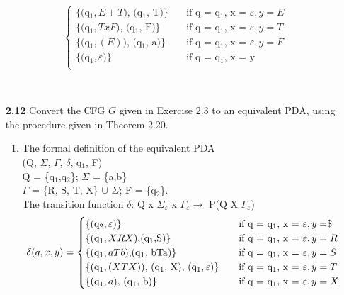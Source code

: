 \documentclass[12pt]{letter}
\begin{document}
\begin{enumerate}
\[\begin{cases}
	\text{\{(q$_{1}, E+T$), (q$_{1}$, T)\}} 
	&\quad\text{if q = q$_{1}$, x = $\varepsilon$}, y = E \\
	
	\text{\{(q$_{1}, TxF$), (q$_{1}$, F)\}} 
	&\quad\text{if q = q$_{1}$, x = $\varepsilon$}, y = T \\
	
	\text{\{(q$_{1}, (E)$), (q$_{1}$, a)\}} 
	&\quad\text{if q = q$_{1}$, x = $\varepsilon$}, y = F \\
	
	\text{\{(q$_{1}, \varepsilon$)\}} 
	&\quad\text{if q = q$_{1}$, x = y}\\ 
	\end{cases}
	\]	

\ \\ %
\item[\textbf{2.12}] Convert the CFG $G$ given in Exercise 2.3 to an equivalent PDA, using the procedure given in Theorem 2.20.\\
\begin{enumerate}
	\item The formal definition of the equivalent PDA\\
	(Q, $\Sigma$, $\Gamma$, $\delta$, q$_{1}$, F)\\
	Q = \{q$_{1}$,q$_{2}$\}; $\Sigma$ = \{a,b\}\\$\Gamma$ = \{R, S, T, X\} $\cup$ $\Sigma$; F = \{q$_{2}$\}.\\
	The transition function $\delta$: Q x $\Sigma _{\varepsilon}$ x $\Gamma_{\varepsilon} \longrightarrow$ P(Q X $\Gamma_{\varepsilon}$)\\
	\[ \delta(q,x,y) = 
	\begin{cases}
	\text{\{(q$_{2},\varepsilon$)\}} 
	&\quad\text{if q = q$_{1}$, x = $\varepsilon$}, y =  $\textdollar$ \\
	
	\text{\{(q$_{1},XRX$),(q$_{1}$,S)\}} 
	&\quad\text{if q = q$_{1}$, x = $\varepsilon$}, y = R \\
	
	\text{\{(q$_{1},aTb$),(q$_{1}$, bTa)\}} 
	&\quad\text{if q = q$_{1}$, x = $\varepsilon$}, y = S \\
	
	\text{\{(q$_{1},(XTX)$), (q$_{1}$, X), (q$_{1}, \varepsilon$)\}} 
	&\quad\text{if q = q$_{1}$, x = $\varepsilon$}, y = T \\
	
	\text{\{(q$_{1}, a$), (q$_{1}$, b)\}} 
	&\quad\text{if q = q$_{1}$, x = $\varepsilon$}, y = X \\
	

\end{cases}\]
\end{enumerate}
\end{enumerate}
\end{document}
